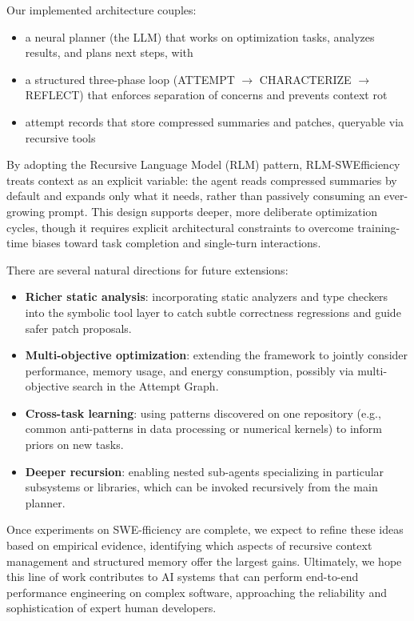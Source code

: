 \documentclass{article}
\theoremstyle{plain}
\theoremstyle{definition}
\theoremstyle{remark}
\begin{document}
Our implemented architecture couples:
\begin{itemize}
    \item a neural planner (the LLM) that works on optimization tasks, analyzes results, and plans next steps, with
    \item a structured three-phase loop (ATTEMPT $\to$ CHARACTERIZE $\to$ REFLECT) that enforces separation of concerns and prevents context rot
    \item attempt records that store compressed summaries and patches, queryable via recursive tools
\end{itemize}
By adopting the Recursive Language Model (RLM) pattern, RLM-SWEfficiency treats context as an explicit variable: the agent reads compressed summaries by default and expands only what it needs, rather than passively consuming an ever-growing prompt. This design supports deeper, more deliberate optimization cycles, though it requires explicit architectural constraints to overcome training-time biases toward task completion and single-turn interactions.

There are several natural directions for future extensions:
\begin{itemize}
    \item \textbf{Richer static analysis}: incorporating static analyzers and type checkers into the symbolic tool layer to catch subtle correctness regressions and guide safer patch proposals.
    \item \textbf{Multi-objective optimization}: extending the framework to jointly consider performance, memory usage, and energy consumption, possibly via multi-objective search in the Attempt Graph.
    \item \textbf{Cross-task learning}: using patterns discovered on one repository (e.g., common anti-patterns in data processing or numerical kernels) to inform priors on new tasks.
    \item \textbf{Deeper recursion}: enabling nested sub-agents specializing in particular subsystems or libraries, which can be invoked recursively from the main planner.
\end{itemize}

Once experiments on SWE-fficiency are complete, we expect to refine these ideas based on empirical evidence, identifying which aspects of recursive context management and structured memory offer the largest gains. Ultimately, we hope this line of work contributes to AI systems that can perform end-to-end performance engineering on complex software, approaching the reliability and sophistication of expert human developers.



\end{document}
